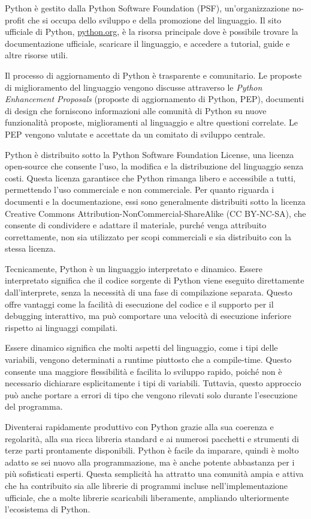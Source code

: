 \documentclass[
  letterpaper,
]{scrbook}
\begin{document}
Python è gestito dalla Python Software Foundation (PSF),
un'organizzazione no-profit che si occupa dello sviluppo e della
promozione del linguaggio. Il sito ufficiale di Python,
\href{https://www.python.org}{python.org}, è la risorsa principale dove
è possibile trovare la documentazione ufficiale, scaricare il
linguaggio, e accedere a tutorial, guide e altre risorse utili.

Il processo di aggiornamento di Python è trasparente e comunitario. Le
proposte di miglioramento del linguaggio vengono discusse attraverso le
\emph{Python Enhancement Proposals} (proposte di aggiornamento di
Python, PEP), documenti di design che forniscono informazioni alle
comunità di Python su nuove funzionalità proposte, miglioramenti al
linguaggio e altre questioni correlate. Le PEP vengono valutate e
accettate da un comitato di sviluppo centrale.

Python è distribuito sotto la Python Software Foundation License, una
licenza open-source che consente l'uso, la modifica e la distribuzione
del linguaggio senza costi. Questa licenza garantisce che Python rimanga
libero e accessibile a tutti, permettendo l'uso commerciale e non
commerciale. Per quanto riguarda i documenti e la documentazione, essi
sono generalmente distribuiti sotto la licenza Creative Commons
Attribution-NonCommercial-ShareAlike (CC BY-NC-SA), che consente di
condividere e adattare il materiale, purché venga attribuito
correttamente, non sia utilizzato per scopi commerciali e sia
distribuito con la stessa licenza.

Tecnicamente, Python è un linguaggio interpretato e dinamico. Essere
interpretato significa che il codice sorgente di Python viene eseguito
direttamente dall'interprete, senza la necessità di una fase di
compilazione separata. Questo offre vantaggi come la facilità di
esecuzione del codice e il supporto per il debugging interattivo, ma può
comportare una velocità di esecuzione inferiore rispetto ai linguaggi
compilati.

Essere dinamico significa che molti aspetti del linguaggio, come i tipi
delle variabili, vengono determinati a runtime piuttosto che a
compile-time. Questo consente una maggiore flessibilità e facilita lo
sviluppo rapido, poiché non è necessario dichiarare esplicitamente i
tipi di variabili. Tuttavia, questo approccio può anche portare a errori
di tipo che vengono rilevati solo durante l'esecuzione del programma.

Diventerai rapidamente produttivo con Python grazie alla sua coerenza e
regolarità, alla sua ricca libreria standard e ai numerosi pacchetti e
strumenti di terze parti prontamente disponibili. Python è facile da
imparare, quindi è molto adatto se sei nuovo alla programmazione, ma è
anche potente abbastanza per i più sofisticati esperti. Questa
semplicità ha attratto una comunità ampia e attiva che ha contribuito
sia alle librerie di programmi incluse nell'implementazione ufficiale,
che a molte librerie scaricabili liberamente, ampliando ulteriormente
l'ecosistema di Python.
\end{document}
